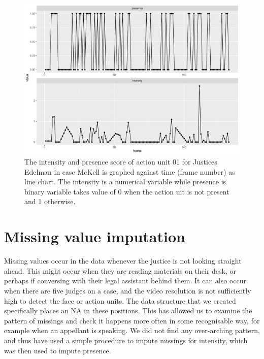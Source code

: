 \documentclass{monashthesis}
\begin{document}
\begin{figure}

{\centering \includegraphics[width=1\linewidth]{figures/ts-plot-1} 

}

\caption{The intensity and presence score of action unit 01 for Justices Edelman in case McKell is graphed against time (frame number) as line chart. The intensity is a numerical variable while presence is binary variable takes value of 0 when the action uit is not present and 1 otherwise.}\label{fig:ts-plot}
\end{figure}

\hypertarget{missing-value-imputation}{%
\section{Missing value imputation}\label{missing-value-imputation}}

Missing values occur in the data whenever the justice is not looking straight ahead. This might occur when they are reading materials on their desk, or perhaps if conversing with their legal assistant behind them. It can also occur when there are five judges on a case, and the video resolution is not sufficiently high to detect the face or action units. The data structure that we created specifically places an NA in these positions. This has allowed us to examine the pattern of missings and check it happens more often in some recognisable way, for example when an appellant is speaking. We did not find any over-arching pattern, and thus have used a simple procedure to impute missings for intensity, which was then used to impute presence.
\end{document}
